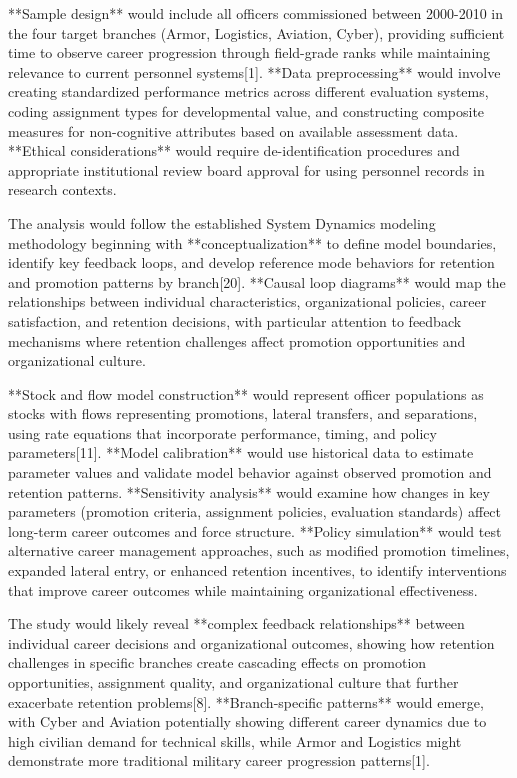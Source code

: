 \documentclass[main.tex]{subfiles}
\begin{document}
**Sample design** would include all officers commissioned between 2000-2010 in the four target branches (Armor, Logistics, Aviation, Cyber), providing sufficient time to observe career progression through field-grade ranks while maintaining relevance to current personnel systems[1]. **Data preprocessing** would involve creating standardized performance metrics across different evaluation systems, coding assignment types for developmental value, and constructing composite measures for non-cognitive attributes based on available assessment data. **Ethical considerations** would require de-identification procedures and appropriate institutional review board approval for using personnel records in research contexts.


The analysis would follow the established System Dynamics modeling methodology beginning with **conceptualization** to define model boundaries, identify key feedback loops, and develop reference mode behaviors for retention and promotion patterns by branch[20]. **Causal loop diagrams** would map the relationships between individual characteristics, organizational policies, career satisfaction, and retention decisions, with particular attention to feedback mechanisms where retention challenges affect promotion opportunities and organizational culture.

**Stock and flow model construction** would represent officer populations as stocks with flows representing promotions, lateral transfers, and separations, using rate equations that incorporate performance, timing, and policy parameters[11]. **Model calibration** would use historical data to estimate parameter values and validate model behavior against observed promotion and retention patterns. **Sensitivity analysis** would examine how changes in key parameters (promotion criteria, assignment policies, evaluation standards) affect long-term career outcomes and force structure. **Policy simulation** would test alternative career management approaches, such as modified promotion timelines, expanded lateral entry, or enhanced retention incentives, to identify interventions that improve career outcomes while maintaining organizational effectiveness.


The study would likely reveal **complex feedback relationships** between individual career decisions and organizational outcomes, showing how retention challenges in specific branches create cascading effects on promotion opportunities, assignment quality, and organizational culture that further exacerbate retention problems[8]. **Branch-specific patterns** would emerge, with Cyber and Aviation potentially showing different career dynamics due to high civilian demand for technical skills, while Armor and Logistics might demonstrate more traditional military career progression patterns[1].
\end{document}
